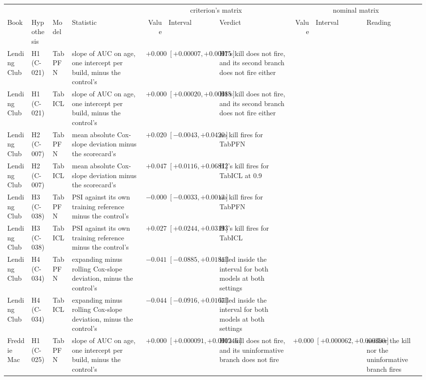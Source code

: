 \begin{tabular}{lllp{3.4cm}rlp{3.4cm}rlp{3.4cm}}
\toprule
 & & & & \multicolumn{3}{c}{criterion's matrix} & \multicolumn{3}{c}{nominal matrix} \\
\cmidrule(lr){5-7}\cmidrule(lr){8-10}
Book & Hypothesis & Model & Statistic & Value & Interval & Verdict & Value & Interval & Reading \\
\midrule
Lending Club & H1 (C-021) & TabPFN & slope of AUC on age, one intercept per build, minus the control's & $+0.00041$ & $[+0.00007, +0.00075]$ & H1's kill does not fire, and its second branch does not fire either &  &  &  \\
Lending Club & H1 (C-021) & TabICL & slope of AUC on age, one intercept per build, minus the control's & $+0.00055$ & $[+0.00020, +0.00088]$ & H1's kill does not fire, and its second branch does not fire either &  &  &  \\
Lending Club & H2 (C-007) & TabPFN & mean absolute Cox-slope deviation minus the scorecard's & $+0.0208$ & $[-0.0043, +0.0420]$ & no kill fires for TabPFN &  &  &  \\
Lending Club & H2 (C-007) & TabICL & mean absolute Cox-slope deviation minus the scorecard's & $+0.0473$ & $[+0.0116, +0.0681]$ & H2's kill fires for TabICL at 0.9 &  &  &  \\
Lending Club & H3 (C-038) & TabPFN & PSI against its own training reference minus the control's & $-0.0007$ & $[-0.0033, +0.0013]$ & no kill fires for TabPFN &  &  &  \\
Lending Club & H3 (C-038) & TabICL & PSI against its own training reference minus the control's & $+0.0277$ & $[+0.0244, +0.0319]$ & H3's kill fires for TabICL &  &  &  \\
Lending Club & H4 (C-034) & TabPFN & expanding minus rolling Cox-slope deviation, minus the control's & $-0.0412$ & $[-0.0885, +0.0181]$ & killed inside the interval for both models at both settings &  &  &  \\
Lending Club & H4 (C-034) & TabICL & expanding minus rolling Cox-slope deviation, minus the control's & $-0.0447$ & $[-0.0916, +0.0167]$ & killed inside the interval for both models at both settings &  &  &  \\
Freddie Mac & H1 (C-025) & TabPFN & slope of AUC on age, one intercept per build, minus the control's & $+0.000168$ & $[+0.000091, +0.000246]$ & H1's kill does not fire, and its uninformative branch does not fire & $+0.000166$ & $[+0.000062, +0.000300]$ & neither the kill nor the uninformative branch fires \\

\end{tabular}
